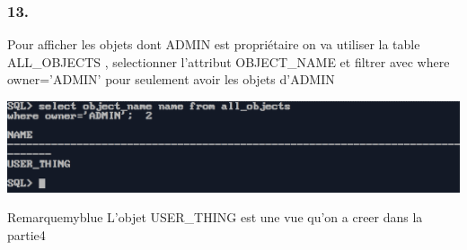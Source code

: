 \subsubsection*{13.}
Pour afficher les objets dont ADMIN est propriétaire on va utiliser
la table ALL\_OBJECTS , selectionner l'attribut OBJECT\_NAME et filtrer avec
where owner='ADMIN' pour seulement avoir les objets d'ADMIN



\begin{center}
    \includegraphics[width=\textwidth]{ScreenShot/Partie5/obj.png}
\end{center}

\begin{prettyBox}{Remarque}{myblue}
L'objet USER\_THING est une vue qu'on a creer dans la partie4
\end{prettyBox}
